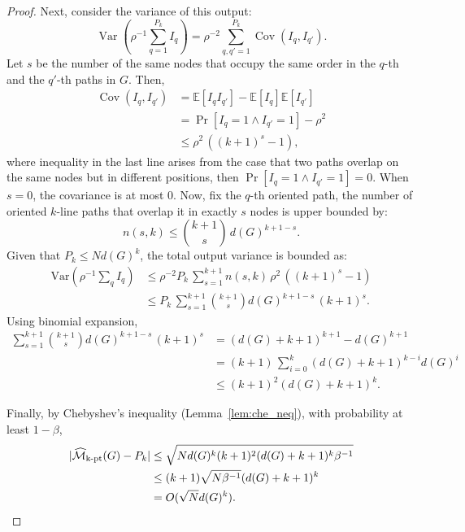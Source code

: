 \begin{proof}
Next, consider the variance of this output:
\begin{equation*}
    \operatorname{Var}(\rho^{-1}\sum_{q=1}^{P_k} I_q)
    =
    \rho^{-2}
     \sum_{q,{q'} =1}^{P_k} \operatorname{Cov}(I_q, I_{q'}).
\end{equation*}
Let $s$ be the number of the same nodes that occupy the same order in the $q$-th and the $q'$-th paths in $G$.
Then,
\begin{align*}
    \operatorname{Cov}(I_q, I_{q'}) 
    &= \mathbb{E}[I_qI_{q'}] - \mathbb{E}[I_q]\mathbb{E}[I_{q'}] \\
    &= \Pr[I_q = 1 \land I_{q'} = 1] - \rho^2\\
    &\leq \rho^2 \, ((k + 1)^{s}-1),
\end{align*}
where inequality in the last line arises from the case that two paths overlap on the same nodes but in different positions, then $\Pr[I_q = 1 \land I_{q'} = 1] = 0$.
When $s =0$, the covariance is at most $0$.
Now, fix the $q$-th oriented path, the number of oriented $k$-line paths that overlap it in exactly $s$ nodes is upper bounded by:
\begin{equation*}
    n(s, k) \leq \binom{k+1}{s}\, d(G)^{k+1-s}.
\end{equation*}
Given that $P_k\leq N d(G)^k$, the total output variance is bounded as:
\begin{align*}
  \mathrm{Var}(\rho^{-1}\sum_q I_q) &\leq 
   \rho^{-2} P_k \,
   \sum_{s=1}^{k+1} n(s, k) \, \rho^2 \, ((k + 1)^{s}-1)
   \\
   & \leq
   P_k \, \sum_{s=1}^{k+1} \binom{k+1}{s}
   d(G)^{k+1-s}\,{(k + 1)^s}.  
\end{align*}
Using binomial expansion, 
\begin{align*}
    \sum_{s=1}^{k+1} \binom{k+1}{s} d(G)^{k+1-s}\,{(k + 1)^s} 
    &= (d(G) +k+1)^{k+1} - d(G)^{k+1} \\
    &= (k+1)\,\sum_{i=0}^{k} (d(G) + k + 1)^{k-i} d(G)^{i}\\
    &\leq (k + 1)^{2} (d(G) + k + 1)^{k}.
\end{align*}

Finally, by Chebyshev's inequality (Lemma~\ref{lem:che_neq}), with probability at least $1- \beta$, 
\begin{align*}
     |\widehat{\mathcal{M}}_{\mathrm{k\text{-}pt}}(G) -P_k| 
     &\leq
  \sqrt{N d(G)^k ({k+1})^2(d(G)+k+1)^{k} \beta^{-1}} \\
  &\leq (k+1) \sqrt{N\beta^{-1}}(d(G)+k+1)^k\\
  &= {O}(\sqrt{N}d(G)^k). \qedhere
\end{align*}
\end{proof}





